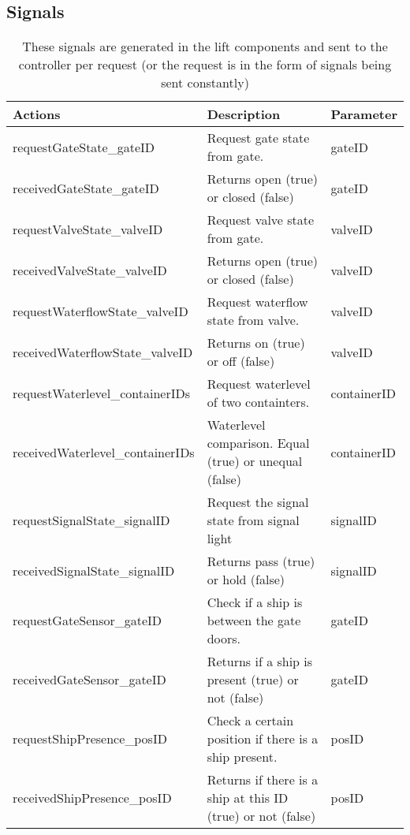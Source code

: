 		\subsection{Signals}
		\begin{table}[htbp]
			\centering
			\caption{These signals are generated in the lift components and sent to the controller per request (or the request is in the form of signals being sent constantly)}
			\begin{tabular}{lll}
				\toprule
				Actions & \textbf{Description} & \textbf{Parameter} \\
				\midrule
				requestGateState\_gateID & Request gate state from gate.  & gateID \\
				receivedGateState\_gateID & Returns open (true) or closed (false) & gateID \\
				requestValveState\_valveID & Request valve state from gate. & valveID \\
				receivedValveState\_valveID & Returns open (true) or closed (false) & valveID \\
				requestWaterflowState\_valveID & Request waterflow state from valve. & valveID \\
				receivedWaterflowState\_valveID & Returns on (true) or off (false) & valveID \\
				requestWaterlevel\_containerIDs & Request waterlevel of two containters. & containerID \\
				receivedWaterlevel\_containerIDs & Waterlevel comparison. Equal (true) or unequal (false) & containerID \\
				requestSignalState\_signalID & Request the signal state from signal light & signalID \\
				receivedSignalState\_signalID & Returns pass (true) or hold (false) & signalID \\
				requestGateSensor\_gateID & Check if a ship is between the gate doors. & gateID \\
				receivedGateSensor\_gateID & Returns if a ship is present (true) or not (false) & gateID \\
				requestShipPresence\_posID & Check a certain position if there is a ship present. & posID \\
				receivedShipPresence\_posID  & Returns if there is a ship at this ID (true) or not (false) & posID \\
				\bottomrule
				\end{tabular}%
				\label{tab:addlabel}%
				\end{table}%
				
				
